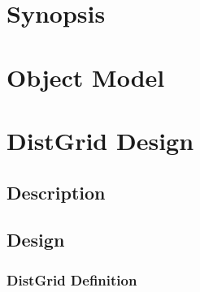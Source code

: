 \documentclass[]{article}
\begin{document}




\newpage
\tableofcontents

\newpage


\section{Synopsis}





%


\section{Object Model}




% 
% 

\section{DistGrid Design}

\subsection{Description}




\subsection{Design}




\subsubsection{DistGrid Definition}


\end{document}
